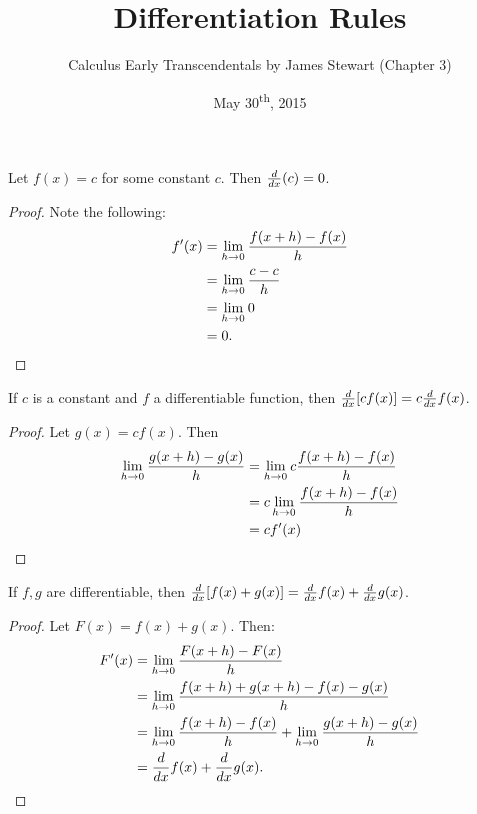 \documentclass[a4paper,8pt]{article}
\title{Differentiation Rules}
\author{Calculus Early Transcendentals by James Stewart (Chapter 3)}
\date{May 30\textsuperscript{th}, 2015}
\begin{document}
\maketitle
{}

\begin{outline}

    Let \(f(x)=c\) for some constant \(c\). Then \(\frac{d}{dx}(c) = 0\).

    \begin{proof}
      Note the following:
      \begin{align*}
        f'(x) &= \lim\limits_{h\rightarrow 0^{}}\frac{f(x+h)-f(x)}{h}\\
              &= \lim\limits_{h\rightarrow 0^{}}\frac{c-c}{h}        \\
              &= \lim\limits_{h\rightarrow 0^{}}0                    \\
              &= 0\text{.}
      \end{align*}
    \end{proof}

    If \(c\) is a constant and \(f\) a differentiable function, then \(\frac{d}{dx}[cf(x)] = c\frac{d}{dx}f(x)\).

    \begin{proof}
      Let \(g(x) = cf(x)\). Then
      \begin{align*}
        \lim\limits_{h\rightarrow 0^{}} \frac{g(x+h)-g(x)}{h} &= \lim\limits_{h\rightarrow 0^{}} c\frac{f(x+h)-f(x)}{h}\\
                                            &= c \lim\limits_{h\rightarrow 0^{}}\frac{f(x+h)-f(x)}{h}\\
                                            &= cf'(x)
      \end{align*}
    \end{proof}

    If \(f, g\) are differentiable, then \(\frac{d}{dx}[f(x)+g(x)] = \frac{d}{dx}f(x) + \frac{d}{dx}g(x)\).

    \begin{proof}
      Let \(F(x) = f(x) + g(x)\). Then:
      \begin{align*}
        F'(x) &= \lim\limits_{h\rightarrow 0^{}}\frac{F(x+h)-F(x)}{h}\\
              &= \lim\limits_{h\rightarrow 0^{}}\frac{f(x+h)+g(x+h)-f(x)-g(x)}{h}\\
              &= \lim\limits_{h\rightarrow 0^{}}\frac{f(x+h)-f(x)}{h} + \lim\limits_{h\rightarrow 0^{}}\frac{g(x+h)-g(x)}{h}\\
              &= \frac{d}{dx}f(x) + \frac{d}{dx}g(x)\text{.}
      \end{align*}
    \end{proof}


\end{outline}
\end{document}
